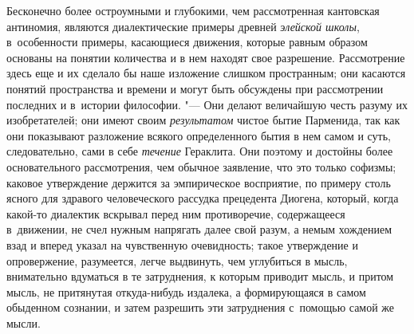 Бесконечно более остроумными и глубокими, чем рассмотренная кантовская
антиномия, являются диалектические примеры древней {\em элейской школы},
в~особенности примеры, касающиеся движения, которые равным образом основаны
на понятии количества и в нем находят свое разрешение. Рассмотрение здесь
еще и их сделало бы наше изложение слишком пространным; они касаются понятий
пространства и времени и могут быть обсуждены при рассмотрении последних и
в~истории философии. "--- Они делают величайшую честь разуму их изобретателей;
они имеют своим {\em результатом} чистое бытие Парменида, так как они
показывают разложение всякого определенного бытия в нем самом и суть,
следовательно, сами в себе {\em течение} Гераклита. Они поэтому и достойны
более основательного рассмотрения, чем обычное заявление, что это только
софизмы; каковое утверждение держится за эмпирическое восприятие, по примеру
столь ясного для здравого человеческого рассудка прецедента Диогена, который,
когда какой-то диалектик вскрывал перед ним противоречие, содержащееся
в~движении, не счел нужным напрягать далее свой разум, а немым хождением взад
и вперед указал на чувственную очевидность; такое утверждение и опровержение,
разумеется, легче выдвинуть, чем углубиться в мысль, внимательно вдуматься
в те затруднения, к которым приводит мысль, и притом мысль, не притянутая
откуда-нибудь издалека, а формирующаяся в самом обыденном сознании, и затем
разрешить эти затруднения с~помощью самой же мысли.

